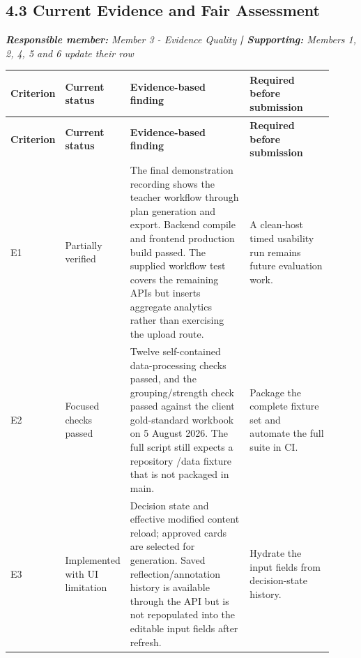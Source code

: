 \documentclass[11pt,a4paper]{article}
\begin{document}
\subsection*{4.3 Current Evidence and Fair Assessment}


\noindent\textit{\textbf{Responsible member: }Member 3 - Evidence Quality\textbf{ | Supporting: }Members 1, 2, 4, 5 and 6 update their row}\par

\begin{small}

\setlength{\tabcolsep}{3pt}

\begin{longtable}{>{\raggedright\arraybackslash}p{0.098\linewidth}>{\raggedright\arraybackslash}p{0.157\linewidth}>{\raggedright\arraybackslash}p{0.389\linewidth}>{\raggedright\arraybackslash}p{0.275\linewidth}}

\hline

\textbf{Criterion} & \textbf{Current status} & \textbf{Evidence-based finding} & \textbf{Required before submission} \\ \hline

\endfirsthead

\hline

\textbf{Criterion} & \textbf{Current status} & \textbf{Evidence-based finding} & \textbf{Required before submission} \\ \hline

\endhead

E1 & Partially verified & The final demonstration recording shows the teacher workflow through plan generation and export. Backend compile and frontend production build passed. The supplied workflow test covers the remaining APIs but inserts aggregate analytics rather than exercising the upload route. & A clean-host timed usability run remains future evaluation work. \\ \hline

E2 & Focused checks passed & Twelve self-contained data-processing checks passed, and the grouping/\allowbreak{}strength check passed against the client gold-standard workbook on 5 August 2026. The full script still expects a repository /\allowbreak{}data fixture that is not packaged in main. & Package the complete fixture set and automate the full suite in CI. \\ \hline

E3 & Implemented with UI limitation & Decision state and effective modified content reload; approved cards are selected for generation. Saved reflection/\allowbreak{}annotation history is available through the API but is not repopulated into the editable input fields after refresh. & Hydrate the input fields from decision-state history. \\ \hline


\end{longtable}
\end{small}
\end{document}
